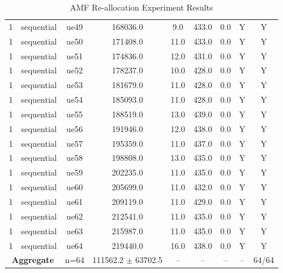 \begin{table}[ht]
\begin{tabular}{|c|c|c|c|c|c|c|c|c|}
1 & sequential & ue49 & 168036.0 & 9.0 & 433.0 & 0.0 & Y & Y \\
1 & sequential & ue50 & 171408.0 & 11.0 & 433.0 & 0.0 & Y & Y \\
1 & sequential & ue51 & 174836.0 & 12.0 & 431.0 & 0.0 & Y & Y \\
1 & sequential & ue52 & 178237.0 & 10.0 & 428.0 & 0.0 & Y & Y \\
1 & sequential & ue53 & 181679.0 & 11.0 & 428.0 & 0.0 & Y & Y \\
1 & sequential & ue54 & 185093.0 & 11.0 & 428.0 & 0.0 & Y & Y \\
1 & sequential & ue55 & 188519.0 & 13.0 & 439.0 & 0.0 & Y & Y \\
1 & sequential & ue56 & 191946.0 & 12.0 & 438.0 & 0.0 & Y & Y \\
1 & sequential & ue57 & 195359.0 & 11.0 & 437.0 & 0.0 & Y & Y \\
1 & sequential & ue58 & 198808.0 & 13.0 & 435.0 & 0.0 & Y & Y \\
1 & sequential & ue59 & 202235.0 & 11.0 & 435.0 & 0.0 & Y & Y \\
1 & sequential & ue60 & 205699.0 & 11.0 & 432.0 & 0.0 & Y & Y \\
1 & sequential & ue61 & 209119.0 & 11.0 & 429.0 & 0.0 & Y & Y \\
1 & sequential & ue62 & 212541.0 & 11.0 & 435.0 & 0.0 & Y & Y \\
1 & sequential & ue63 & 215987.0 & 11.0 & 435.0 & 0.0 & Y & Y \\
1 & sequential & ue64 & 219440.0 & 16.0 & 438.0 & 0.0 & Y & Y \\
\multicolumn{2}{|c|}{\textbf{Aggregate}} & n=64 & 111562.2 $\pm$ 63702.5 & -- & -- & -- & -- & 64/64 \\
\hline
\end{tabular}
\caption{AMF Re-allocation Experiment Results}
\label{tab:amf_realloc}
\end{table}
